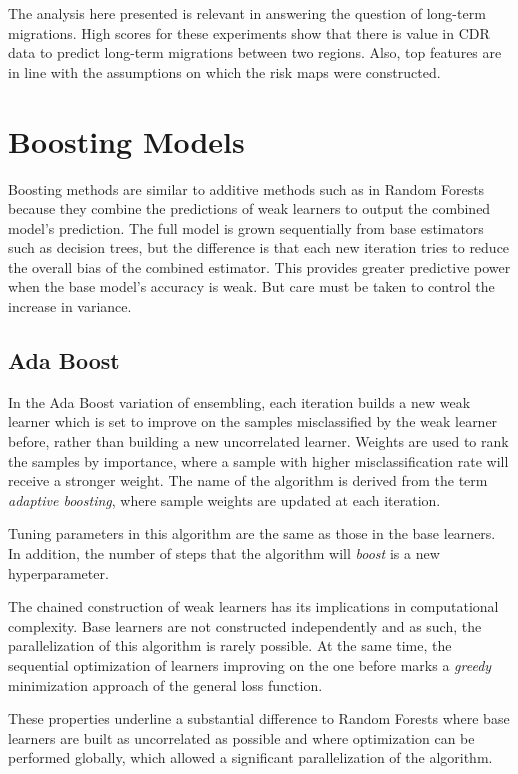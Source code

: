 The analysis here presented is relevant in answering the question of long-term migrations.
High scores for these experiments show that there is value in CDR data to predict long-term migrations between two regions.
Also, top features are in line with the assumptions on which the risk maps were constructed.



\section{Boosting Models}\label{section:gradient_boosting}

Boosting methods are similar to additive methods such as in Random Forests because they combine the predictions of weak learners to output the combined model's prediction.
The full model is grown sequentially from base estimators such as decision trees, but the difference is that each new iteration tries to reduce the overall bias of the combined estimator.
This provides greater predictive power when the base model's accuracy is weak. 
But care must be taken to control the increase in variance.

\subsection{Ada Boost}

In the Ada Boost variation of ensembling, each iteration builds a new weak learner which is set to improve on the samples misclassified by the weak learner before, rather than building a new uncorrelated learner.
Weights are used to rank the samples by importance, where a sample with higher misclassification rate will receive a stronger weight.
The name of the algorithm is derived from the term \textit{adaptive boosting}, where sample weights are updated at each iteration.

Tuning parameters in this algorithm are the same as those in the base learners. 
In addition, the number of steps that the algorithm will \textit{boost} is a new hyperparameter.

The chained construction of weak learners has its implications in computational complexity. 
Base learners are not constructed independently and as such, the parallelization of this algorithm is rarely possible. 
At the same time, the sequential optimization of learners improving on the one before marks a \textit{greedy} minimization approach of the general loss function.

These properties underline a substantial difference to Random Forests where base learners are built as uncorrelated as possible and where optimization can be performed globally, which allowed a significant parallelization of the algorithm.

